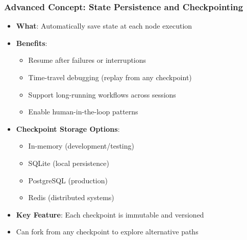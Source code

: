 \begin{frame}[fragile]\frametitle{Advanced Concept: State Persistence and Checkpointing}
      \begin{itemize}
        \item \textbf{What}: Automatically save state at each node execution
        \item \textbf{Benefits}:
        \begin{itemize}
            \item Resume after failures or interruptions
            \item Time-travel debugging (replay from any checkpoint)
            \item Support long-running workflows across sessions
            \item Enable human-in-the-loop patterns
        \end{itemize}
        \item \textbf{Checkpoint Storage Options}:
        \begin{itemize}
            \item In-memory (development/testing)
            \item SQLite (local persistence)
            \item PostgreSQL (production)
            \item Redis (distributed systems)
        \end{itemize}
        \item \textbf{Key Feature}: Each checkpoint is immutable and versioned
        \item Can fork from any checkpoint to explore alternative paths
      \end{itemize}
	  

\end{frame}

